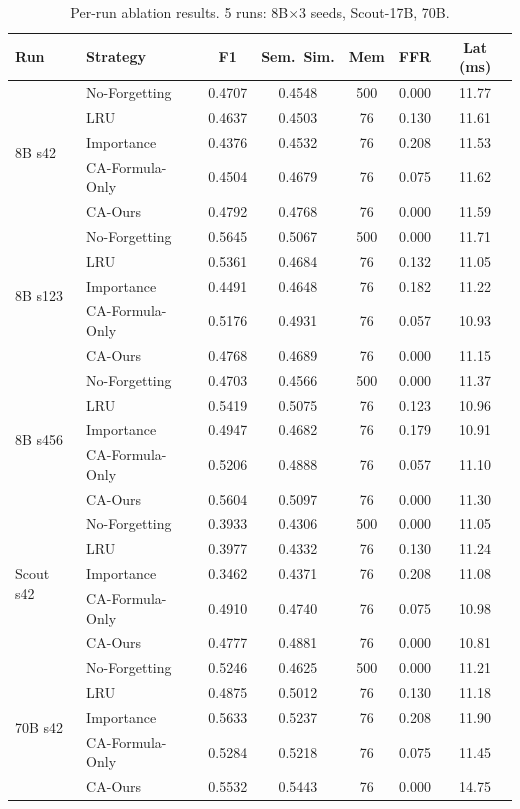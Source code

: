 \documentclass{article}
\begin{document}
\begin{table}[h]
\centering
\caption{Per-run ablation results.  5 runs: 8B$\times$3 seeds, Scout-17B, 70B.}
\label{tab:ablation_full}
\setlength{\tabcolsep}{4pt}
\begin{tabular}{llccccc}
\toprule
Run & Strategy & F1 & Sem.\ Sim. & Mem & FFR & Lat (ms) \\
\midrule
\multirow{5}{*}{8B s42}
 & No-Forgetting     & 0.4707 & 0.4548 & 500 & 0.000 & 11.77 \\
 & LRU               & 0.4637 & 0.4503 & 76  & 0.130 & 11.61 \\
 & Importance        & 0.4376 & 0.4532 & 76  & 0.208 & 11.53 \\
 & CA-Formula-Only   & 0.4504 & 0.4679 & 76  & 0.075 & 11.62 \\
 & CA-Ours           & 0.4792 & 0.4768 & 76  & 0.000 & 11.59 \\
\midrule
\multirow{5}{*}{8B s123}
 & No-Forgetting     & 0.5645 & 0.5067 & 500 & 0.000 & 11.71 \\
 & LRU               & 0.5361 & 0.4684 & 76  & 0.132 & 11.05 \\
 & Importance        & 0.4491 & 0.4648 & 76  & 0.182 & 11.22 \\
 & CA-Formula-Only   & 0.5176 & 0.4931 & 76  & 0.057 & 10.93 \\
 & CA-Ours           & 0.4768 & 0.4689 & 76  & 0.000 & 11.15 \\
\midrule
\multirow{5}{*}{8B s456}
 & No-Forgetting     & 0.4703 & 0.4566 & 500 & 0.000 & 11.37 \\
 & LRU               & 0.5419 & 0.5075 & 76  & 0.123 & 10.96 \\
 & Importance        & 0.4947 & 0.4682 & 76  & 0.179 & 10.91 \\
 & CA-Formula-Only   & 0.5206 & 0.4888 & 76  & 0.057 & 11.10 \\
 & CA-Ours           & 0.5604 & 0.5097 & 76  & 0.000 & 11.30 \\
\midrule
\multirow{5}{*}{Scout s42}
 & No-Forgetting     & 0.3933 & 0.4306 & 500 & 0.000 & 11.05 \\
 & LRU               & 0.3977 & 0.4332 & 76  & 0.130 & 11.24 \\
 & Importance        & 0.3462 & 0.4371 & 76  & 0.208 & 11.08 \\
 & CA-Formula-Only   & 0.4910 & 0.4740 & 76  & 0.075 & 10.98 \\
 & CA-Ours           & 0.4777 & 0.4881 & 76  & 0.000 & 10.81 \\
\midrule
\multirow{5}{*}{70B s42}
 & No-Forgetting     & 0.5246 & 0.4625 & 500 & 0.000 & 11.21 \\
 & LRU               & 0.4875 & 0.5012 & 76  & 0.130 & 11.18 \\
 & Importance        & 0.5633 & 0.5237 & 76  & 0.208 & 11.90 \\
 & CA-Formula-Only   & 0.5284 & 0.5218 & 76  & 0.075 & 11.45 \\
 & CA-Ours           & 0.5532 & 0.5443 & 76  & 0.000 & 14.75 \\
\bottomrule
\end{tabular}
\end{table}
\end{document}
